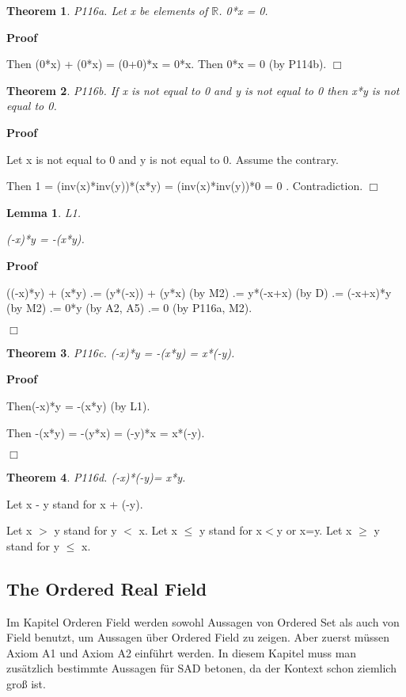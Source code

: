 \documentclass{article}
\newenvironment{forthel}{\begin{leftbar}}{\end{leftbar}}
\newenvironment{proof}{\noindent\textbf{Proof\ }}{\hspace*{\fill}$\Box$\medskip}
\newtheorem{lemma}{Lemma}
\newtheorem{theorem}{Theorem}
\begin{document}
\begin{forthel}
\begin{theorem}
 P116a.
Let x be elements of $\mathbb{R}$. 0*x = 0.\end{theorem}
\begin{proof}

Then (0*x) + (0*x)
= (0+0)*x
= 0*x.
Then 0*x = 0 (by P114b).
\end{proof}

\begin{theorem}
 P116b. 
If x is not equal to 0 and y is not equal to 0 then x*y is not equal to 0.\end{theorem}
\begin{proof}


Let x is not equal to 0 and y is not equal to 0.
Assume the contrary.

Then 1 = (inv(x)*inv(y))*(x*y)
= (inv(x)*inv(y))*0
= 0 .
Contradiction.
\end{proof}


\begin{lemma} L1.


(-x)*y = -(x*y).\end{lemma}
\begin{proof}


((-x)*y) + (x*y) .= (y*(-x)) + (y*x) (by M2)
.= y*(-x+x) (by D) 
.= (-x+x)*y (by M2)
.= 0*y (by A2, A5)
.= 0 (by P116a, M2).

\end{proof}
 
\begin{theorem}
 P116c.
(-x)*y = -(x*y) = x*(-y).\end{theorem}
\begin{proof}

Then(-x)*y = -(x*y) (by L1).

Then -(x*y) = -(y*x) = (-y)*x = x*(-y).

\end{proof}
 

\begin{theorem}
 P116d.
(-x)*(-y)= x*y.\end{theorem}


Let x - y stand for x + (-y).


Let x $>$ y stand for y $<$ x.
Let x $\leq$ y stand for x$<$y or x=y.
Let x $\geq$ y stand for y $\leq$ x.



\end{forthel}

\subsection{The Ordered Real Field}
Im Kapitel Orderen Field werden sowohl Aussagen von Ordered Set als auch von Field benutzt, um Aussagen über Ordered Field zu zeigen.
Aber zuerst müssen Axiom A1 und Axiom A2 einführt werden.
In diesem Kapitel muss man zusätzlich bestimmte Aussagen für SAD betonen, da der Kontext schon ziemlich groß ist.
\end{document}
